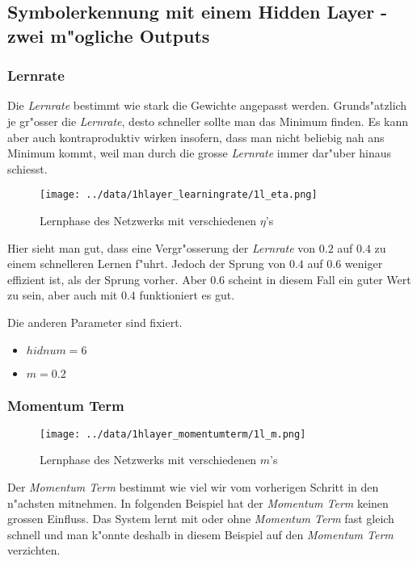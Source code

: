 \documentclass[10pt]{article}
\begin{document}
\subsection{Symbolerkennung mit einem Hidden Layer - zwei m"ogliche Outputs}

\subsubsection{Lernrate}
Die \textit{Lernrate} bestimmt wie stark die Gewichte angepasst werden. Grunds"atzlich je gr"osser die \textit{Lernrate}, desto schneller sollte man das Minimum finden. Es kann aber auch kontraproduktiv wirken insofern, dass man nicht beliebig nah ans Minimum kommt, weil man durch die grosse \textit{Lernrate} immer dar"uber hinaus schiesst.

\begin{figure}[hp!]
\centering
\texttt{[image: ../data/1hlayer\_learningrate/1l\_eta.png]}
\caption{Lernphase des Netzwerks mit verschiedenen $\eta$'s}
\end{figure}

Hier sieht man gut, dass eine Vergr"osserung der \textit{Lernrate} von $0.2$ auf $0.4$ zu einem schnelleren Lernen f"uhrt. Jedoch der Sprung von $0.4$ auf $0.6$ weniger effizient ist, als der Sprung vorher. Aber $0.6$ scheint in diesem Fall ein guter Wert zu sein, aber auch mit $0.4$ funktioniert es gut.

Die anderen Parameter sind fixiert.

\begin{itemize}
\item $hidnum = 6$
\item $m = 0.2$
\end{itemize}

\subsubsection{Momentum Term}


\begin{figure}[hp!]
\centering
\texttt{[image: ../data/1hlayer\_momentumterm/1l\_m.png]}
\caption{Lernphase des Netzwerks mit verschiedenen $m$'s}
\end{figure}

Der \textit{Momentum Term} bestimmt wie viel wir vom vorherigen Schritt in den n"achsten mitnehmen. In folgenden Beispiel hat der \textit{Momentum Term} keinen grossen Einfluss. Das System lernt mit oder ohne \textit{Momentum Term} fast gleich schnell und man k"onnte deshalb in diesem Beispiel auf den \textit{Momentum Term} verzichten.
\end{document}
